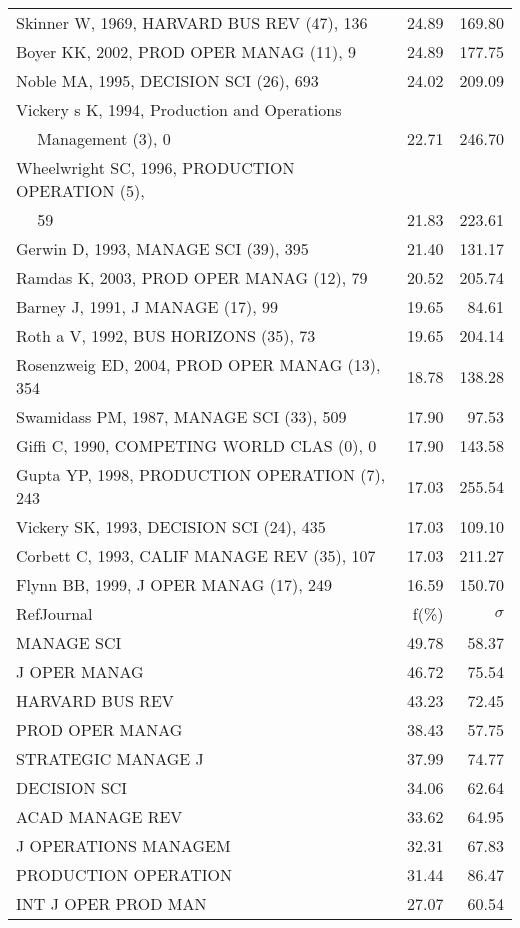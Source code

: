 \documentclass[a4paper,11pt]{report}
\begin{document}
\begin{landscape}
\begin{table}[!ht]
{\begin{tabular}{|l r r|}
Skinner W, 1969, HARVARD BUS REV (47), 136 & 24.89 & 169.80\\
Boyer KK, 2002, PROD OPER MANAG (11), 9 & 24.89 & 177.75\\
Noble MA, 1995, DECISION SCI (26), 693 & 24.02 & 209.09\\
Vickery s K, 1994, Production and Operations &  & \\
$\quad$ Management (3), 0 & 22.71 & 246.70\\
Wheelwright SC, 1996, PRODUCTION OPERATION (5), &  & \\
$\quad$ 59 & 21.83 & 223.61\\
Gerwin D, 1993, MANAGE SCI (39), 395 & 21.40 & 131.17\\
Ramdas K, 2003, PROD OPER MANAG (12), 79 & 20.52 & 205.74\\
Barney J, 1991, J MANAGE (17), 99 & 19.65 & 84.61\\
Roth a V, 1992, BUS HORIZONS (35), 73 & 19.65 & 204.14\\
Rosenzweig ED, 2004, PROD OPER MANAG (13), 354 & 18.78 & 138.28\\
Swamidass PM, 1987, MANAGE SCI (33), 509 & 17.90 & 97.53\\
Giffi C, 1990, COMPETING WORLD CLAS (0), 0 & 17.90 & 143.58\\
Gupta YP, 1998, PRODUCTION OPERATION (7), 243 & 17.03 & 255.54\\
Vickery SK, 1993, DECISION SCI (24), 435 & 17.03 & 109.10\\
Corbett C, 1993, CALIF MANAGE REV (35), 107 & 17.03 & 211.27\\
Flynn BB, 1999, J OPER MANAG (17), 249 & 16.59 & 150.70\\
\hline
\hline
RefJournal & f(\%) & $\sigma$\\
\hline
MANAGE SCI & 49.78 & 58.37\\
J OPER MANAG & 46.72 & 75.54\\
HARVARD BUS REV & 43.23 & 72.45\\
PROD OPER MANAG & 38.43 & 57.75\\
STRATEGIC MANAGE J & 37.99 & 74.77\\
DECISION SCI & 34.06 & 62.64\\
ACAD MANAGE REV & 33.62 & 64.95\\
J OPERATIONS MANAGEM & 32.31 & 67.83\\
PRODUCTION OPERATION & 31.44 & 86.47\\
INT J OPER PROD MAN & 27.07 & 60.54\\
\hline
\end{tabular}
}
\end{table}

\end{landscape}
\end{document}

